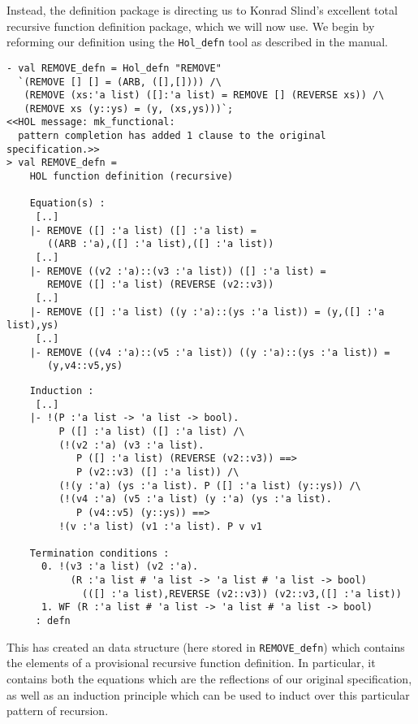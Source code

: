 Instead, the definition package is directing us to Konrad Slind's excellent
total recursive function definition package, which we will now use.
We begin by reforming our definition using
the {\tt Hol\_defn} tool as described in the \DESCRIPTION{} manual.
\begin{session}
\begin{verbatim}
- val REMOVE_defn = Hol_defn "REMOVE"
  `(REMOVE [] [] = (ARB, ([],[]))) /\
   (REMOVE (xs:'a list) ([]:'a list) = REMOVE [] (REVERSE xs)) /\
   (REMOVE xs (y::ys) = (y, (xs,ys)))`;
<<HOL message: mk_functional: 
  pattern completion has added 1 clause to the original specification.>>
> val REMOVE_defn =
    HOL function definition (recursive)
    
    Equation(s) :
     [..]
    |- REMOVE ([] :'a list) ([] :'a list) =
       ((ARB :'a),([] :'a list),([] :'a list))
     [..]
    |- REMOVE ((v2 :'a)::(v3 :'a list)) ([] :'a list) =
       REMOVE ([] :'a list) (REVERSE (v2::v3))
     [..]
    |- REMOVE ([] :'a list) ((y :'a)::(ys :'a list)) = (y,([] :'a list),ys)
     [..]
    |- REMOVE ((v4 :'a)::(v5 :'a list)) ((y :'a)::(ys :'a list)) =
       (y,v4::v5,ys)
\end{verbatim}
\end{session}
   
\begin{session}
\begin{verbatim}
    Induction :
     [..]
    |- !(P :'a list -> 'a list -> bool).
         P ([] :'a list) ([] :'a list) /\
         (!(v2 :'a) (v3 :'a list).
            P ([] :'a list) (REVERSE (v2::v3)) ==>
            P (v2::v3) ([] :'a list)) /\
         (!(y :'a) (ys :'a list). P ([] :'a list) (y::ys)) /\
         (!(v4 :'a) (v5 :'a list) (y :'a) (ys :'a list).
            P (v4::v5) (y::ys)) ==>
         !(v :'a list) (v1 :'a list). P v v1
    
    Termination conditions :
      0. !(v3 :'a list) (v2 :'a).
           (R :'a list # 'a list -> 'a list # 'a list -> bool)
             (([] :'a list),REVERSE (v2::v3)) (v2::v3,([] :'a list))
      1. WF (R :'a list # 'a list -> 'a list # 'a list -> bool)
     : defn
\end{verbatim}
\end{session}
This has created an \ML{} data structure (here stored in {\tt REMOVE\_defn})
which contains the elements of a provisional recursive function definition.
In particular, it contains both the equations which are the 
reflections of our original specification, as well as an induction
principle which can be used to induct over this particular pattern
of recursion.

